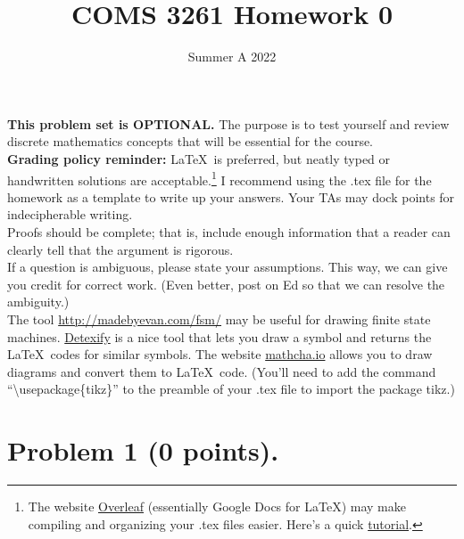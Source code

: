 \documentclass{../homework}
\title{COMS 3261 Homework 0}
\date{Summer A 2022}
\begin{document}
\maketitle

\textbf{This problem set is OPTIONAL. } The purpose is to test yourself and review discrete mathematics concepts that will be essential for the course. \\


\textbf{Grading policy reminder:} \LaTeX~is preferred, but neatly typed or handwritten solutions are acceptable.\footnote{The website \href{https://www.overleaf.com/}{Overleaf} (essentially Google Docs for LaTeX) may make compiling and organizing your .tex files easier. Here's a quick \href{https://www.overleaf.com/learn/latex/Learn_LaTeX_in_30_minutes}{tutorial}.} I recommend using the .tex file for the homework as a template to write up your answers. Your TAs may dock points for indecipherable writing.\\

Proofs should be complete; that is, include enough information that a reader can clearly tell that the argument is rigorous. \\

If a question is ambiguous, please state your assumptions. This way, we can give you credit for correct work. (Even better, post on Ed so that we can resolve the ambiguity.) \\

The tool \url{http://madebyevan.com/fsm/} may be useful for drawing finite state machines. \href{https://detexify.kirelabs.org/classify.html}{Detexify} is a nice tool that lets you draw a symbol and returns the \LaTeX~codes for similar symbols. The website \href{https://www.mathcha.io/}{mathcha.io} allows you to draw diagrams and convert them to \LaTeX~code. (You'll need to add the command ``\textbackslash usepackage\{tikz\}'' to the preamble of your .tex file to import the package tikz.)



\clearpage
\section{
    Problem 1 (0 points).
}
    
\end{document}
